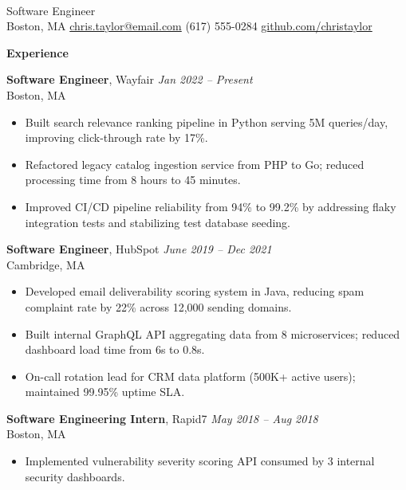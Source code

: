 \documentclass[11pt,a4paper]{article}
\begin{document}
\\
Software Engineer\\[2pt]
Boston, MA \quad
\href{mailto:chris.taylor@email.com}{chris.taylor@email.com} \quad
(617) 555-0284 \quad
\href{https://github.com/christaylor}{github.com/christaylor}

\vspace{10pt}
\noindent\textbf{Experience}
\vspace{3pt}

\noindent\textbf{Software Engineer}, Wayfair \hfill \textit{Jan 2022 -- Present}\\
Boston, MA
\begin{itemize}
  \item Built search relevance ranking pipeline in Python serving 5M queries/day, improving click-through rate by 17\%.
  \item Refactored legacy catalog ingestion service from PHP to Go; reduced processing time from 8 hours to 45 minutes.
  \item Improved CI/CD pipeline reliability from 94\% to 99.2\% by addressing flaky integration tests and stabilizing test database seeding.
\end{itemize}

\vspace{4pt}
\noindent\textbf{Software Engineer}, HubSpot \hfill \textit{June 2019 -- Dec 2021}\\
Cambridge, MA
\begin{itemize}
  \item Developed email deliverability scoring system in Java, reducing spam complaint rate by 22\% across 12,000 sending domains.
  \item Built internal GraphQL API aggregating data from 8 microservices; reduced dashboard load time from 6s to 0.8s.
  \item On-call rotation lead for CRM data platform (500K+ active users); maintained 99.95\% uptime SLA.
\end{itemize}

\vspace{4pt}
\noindent\textbf{Software Engineering Intern}, Rapid7 \hfill \textit{May 2018 -- Aug 2018}\\
Boston, MA
\begin{itemize}
  \item Implemented vulnerability severity scoring API consumed by 3 internal security dashboards.
\end{itemize}
\end{document}
